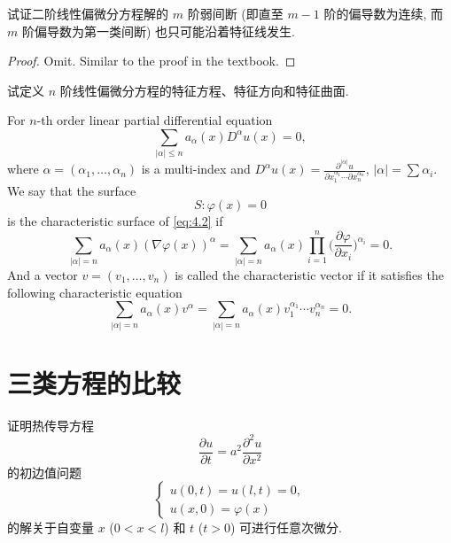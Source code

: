 \begin{exercise}
  试证二阶线性偏微分方程解的 $m$ 阶弱间断 (即直至 $m-1$ 阶的偏导数为连续, 而 $m$ 阶偏导数为第一类间断)
  也只可能沿着特征线发生.
\end{exercise}

\begin{proof}
  Omit. Similar to the proof in the textbook.
\end{proof}


\begin{exercise}
  试定义 $n$ 阶线性偏微分方程的特征方程、特征方向和特征曲面.
\end{exercise}

\begin{solution}
  For $n$-th order linear partial differential equation
  \begin{equation}\label{eq:4.2}
    \sum_{|\alpha|\leq n} a_\alpha(x) D^\alpha u(x) = 0,
  \end{equation}
  where $\alpha=(\alpha_1,\ldots,\alpha_n)$ is a multi-index
  and $D^\alpha u(x) = \frac{\partial^{|\alpha|} u}{\partial x_1^{\alpha_1}\cdots\partial x_n^{\alpha_n}}$,
  $|\alpha| = \sum \alpha_i$. We say that the surface
  \begin{equation}\label{eq:4.3}
    S: \varphi(x) = 0
  \end{equation}
  is the characteristic surface of \eqref{eq:4.2} if
  \begin{equation}\label{eq:4.4}
    \sum_{|\alpha|=n} a_\alpha(x) (\nabla\varphi(x))^\alpha
      = \sum_{|\alpha|=n} a_\alpha(x) \prod_{i=1}^n
        \biggl(\frac{\partial\varphi}{\partial x_i}\biggr)^{\alpha_i} = 0.
  \end{equation}
  And a vector $v = (v_1,\ldots,v_n)$ is called the characteristic vector
  if it satisfies the following characteristic equation
  \begin{equation}\label{eq:4.5}
    \sum_{|\alpha|=n} a_\alpha(x) v^\alpha
      = \sum_{|\alpha|=n} a_\alpha(x) v_1^{\alpha_1} \cdots v_n^{\alpha_n} = 0.
  \end{equation}
\end{solution}


\section{三类方程的比较}


\begin{exercise}
  证明热传导方程
  \[\frac{\partial u}{\partial t} = a^2 \frac{\partial^2 u}{\partial x^2}\]
  的初边值问题
  \[\begin{cases}
    u(0, t) = u(l, t) = 0, \\
    u(x, 0) = \varphi(x)
  \end{cases}\]
  的解关于自变量 $x$ ($0<x<l$) 和 $t$ ($t>0$) 可进行任意次微分.
\end{exercise}

